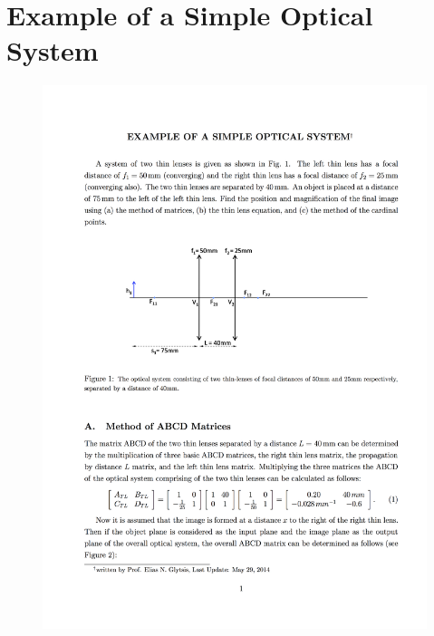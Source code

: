 
\chapter{Example of a Simple Optical System}
\label{chap:Annex1}

\begin{figure}[!b]
	
	\centering
	\includegraphics[width=1.0\linewidth]{__Images/09/Glytsis2014_1.png}
\end{figure}


